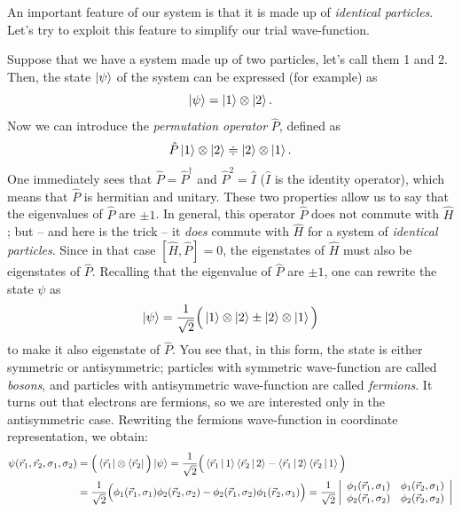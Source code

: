 \documentclass[a4paper,twoside,11pt]{book}
\begin{document}
An important feature of our system is that it is made up of \emph{identical particles}. Let's try to exploit this feature to simplify our trial wave-function.

Suppose that we have a system made up of two particles, let's call them 1 and 2. Then, the state $\Ket{\psi}$ of the system can be expressed (for example) as
\begin{equation}
	\Ket{\psi} = \Ket{1} \otimes \Ket{2}.
\end{equation}
Now we can introduce the \emph{permutation operator} $\hat{P}$, defined as
\begin{equation}
	\hat{P} \Ket{1} \otimes \Ket{2} \doteqdot \Ket{2} \otimes \Ket{1}.
\end{equation}
One immediately sees that $\hat{P} = \hat{P}^{\dagger}$ and $\hat{P}^2 = \hat{I}$ ($\hat{I}$ is the identity operator), which means that $\hat{P}$ is hermitian and unitary. These two properties allow us to say that the eigenvalues of $\hat{P}$ are $\pm 1$. In general, this operator $\hat{P}$ does not commute with $\hat{H}$; but -- and here is the trick -- it \emph{does} commute with $\hat{H}$ for a system of \emph{identical particles}. Since in that case $[\hat{H},\hat{P}] = 0$, the eigenstates of $\hat{H}$ must also be eigenstates of $\hat{P}$. Recalling that the eigenvalue of $\hat{P}$ are $\pm 1$, one can rewrite the state $\psi$ as
\begin{equation}
	\Ket{\psi} = \frac{1}{\sqrt{2}} \Big( \Ket{1} \otimes \Ket{2} \pm \Ket{2} \otimes \Ket{1} \Big)
	\label{eq:identical_particles}
\end{equation}
to make it also eigenstate of $\hat{P}$. You see that, in this form, the state is either symmetric or antisymmetric; particles with symmetric wave-function are called \emph{bosons}, and particles with antisymmetric wave-function are called \emph{fermions}. It turns out that electrons are fermions, so we are interested only in the antisymmetric case. Rewriting the fermions wave-function in coordinate representation, we obtain:
\begin{align}
	\psi(\vec{r}_1,\vec{r}_2,\sigma_1,\sigma_2) 
	&= \Big( \Bra{\vec{r}_1} \otimes \Bra{\vec{r}_2} \Big) \Ket{\psi}
	= \frac{1}{\sqrt{2}} \Big( \Braket{\vec{r}_1|1}\Braket{\vec{r}_2|2} - \Braket{\vec{r}_1|2}\Braket{\vec{r}_2|1} \Big) \\
	&= \frac{1}{\sqrt{2}} \Big( \phi_1(\vec{r}_1,\sigma_1)\phi_2(\vec{r}_2,\sigma_2) - \phi_2(\vec{r}_1,\sigma_2)\phi_1(\vec{r}_2,\sigma_1) \Big)
	= \frac{1}{\sqrt{2}} \left\lvert
	\begin{array}{cc}
		\phi_1(\vec{r}_1,\sigma_1) & \phi_1(\vec{r}_2,\sigma_1) \\
		\phi_2(\vec{r}_1,\sigma_2) & \phi_2(\vec{r}_2,\sigma_2)
	\end{array}
	\right\lvert
	\label{eq:slater_example}
\end{align}
\end{document}
